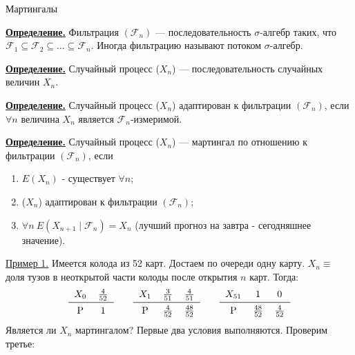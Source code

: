 \documentclass[a4paper]{article}
\begin{document}
  \begin{center}
	{\large{Мартингалы}}
\end{center}
\par{\bf\underline{Определение.}} Фильтрация $(\mathcal{F}_{n})$ — последовательность $\sigma$-алгебр таких, что $\mathcal{F}_{1}\subseteq \mathcal{F}_{2} \subseteq \ldots  \subseteq \mathcal{F}_{n}$. Иногда фильтрацию называют потоком $\sigma$-алгебр.
\\
\par{\bf\underline{Определение.}} Случайный процесс ($X_{n}$) — последовательность случайных величин $X_{n}$.
\\
\par{\bf\underline{Определение.}} Случайный процесс ($X_{n}$) адаптирован к фильтрации $(\mathcal{F}_{n})$, если $\forall n$ величина $X_{n}$ является $\mathcal{F}_{n}$-измеримой.
\\
\par{\bf\underline{Определение.}} Случайный процесс ($X_{n}$) — мартингал по отношению к фильтрации $(\mathcal{F}_{n})$, если
\begin{enumerate}
	\item $E(X_{n})$ - существует $\forall n$;
	\item ($X_{n}$) адаптирован к фильтрации $(\mathcal{F}_{n})$;
	\item $\forall n \ E(X_{n+1} \mid \mathcal{F}_{n})=X_{n}$ (лучший прогноз на завтра - сегодняшнее значение).
\end{enumerate}
\par\underline{Пример 1.} Имеется колода из 52 карт. Достаем по очереди одну карту. $X_{n}\equiv$ доля тузов в неоткрытой части колоды после открытия $n$ карт. Тогда:
\\
\[\begin{tabular}{cc}
$X_{0}$&$\frac{4}{52}$\\
\midrule
P&$1$\\
\end{tabular}
\quad \quad
\begin{tabular}{ccc}
$X_{1}$&$\frac{3}{51}$&$\frac{4}{51}$\\
\midrule
P&$\frac{4}{52}$&$\frac{48}{52}$\\
\end{tabular}
\quad \quad \begin{tabular}{ccc}
$X_{51}$&$1$&$0$\\
\midrule
P&$\frac{48}{52}$&$\frac{4}{52}$\\
\end{tabular}\]
Является ли $X_{n}$ мартингалом? Первые два условия выполняются. Проверим третье:
\end{document}
